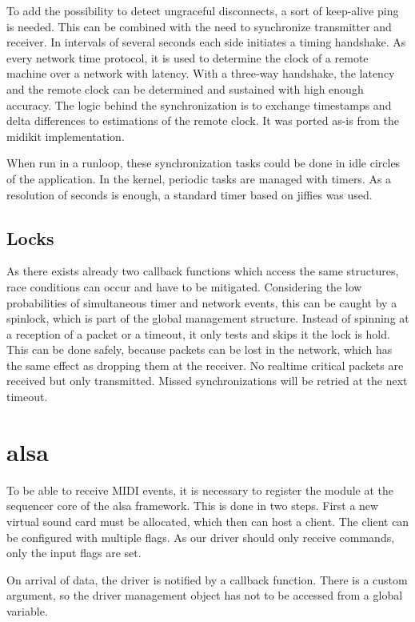 \documentclass[paper=a4,fontsize=11pt,twocolumn,pagesize,bibtotoc]{scrartcl}
\begin{document}
	To add the possibility to detect ungraceful disconnects, a sort of keep-alive ping is needed. This can be combined with the need to synchronize transmitter and receiver. In intervals of several seconds each side initiates a timing handshake. As every network time protocol, it is used to determine the clock of a remote machine over a network with latency. With a three-way handshake, the latency and the remote clock can be determined and sustained with high enough accuracy.
	The logic behind the synchronization is to exchange timestamps and delta differences to estimations of the remote clock. It was ported as-is from the midikit implementation.
	
	When run in a runloop, these synchronization tasks could be done in idle circles of the application. In the kernel, periodic tasks are managed with timers. As a resolution of seconds is enough, a standard timer based on jiffies was used.
	
	\subsection{Locks}
	
	As there exists already two callback functions which access the same structures, race conditions can occur and have to be mitigated. Considering the low probabilities of simultaneous timer and network events, this can be caught by a spinlock, which is part of the global management structure. Instead of spinning at a reception of a packet or a timeout, it only tests and skips it the lock is hold. This can be done safely, because packets can be lost in the network, which has the same effect as dropping them at the receiver. No realtime critical packets are received but only transmitted. Missed synchronizations will be retried at the next timeout.  
	
	\section{alsa}
	
	To be able to receive MIDI events, it is necessary to register the module at the sequencer core of the alsa framework. This is done in two steps. First a new virtual sound card must be allocated, which then can host a client. The client can be configured with multiple flags. As our driver should only receive commands, only the input flags are set.
	
	On arrival of data, the driver is notified by a callback function. There is a custom argument, so the driver management object has not to be accessed from a global variable.
	
\end{document}
